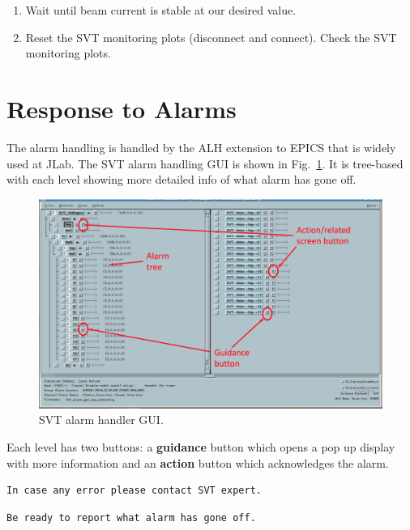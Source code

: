 \documentclass[12pt]{report}
\begin{document}
\begin{enumerate}
\item Wait until beam current is stable at our desired value.
\item Reset the SVT monitoring plots (disconnect and connect). Check the SVT monitoring plots.
\end{enumerate}


\section{Response to Alarms}

The alarm handling is handled by the ALH extension to EPICS that is widely used at JLab. The SVT alarm handling GUI is shown in Fig.~\ref{fig:svt_alarm_gui}. It is tree-based with each level showing more detailed info of what alarm has gone off. 
\begin{figure}[ht]
\includegraphics[width=12cm]{svt_alarm_gui}
\caption{SVT alarm handler GUI.\label{fig:svt_alarm_gui}}
\end{figure}

Each level has two buttons: a \textbf{guidance} button which opens a pop up display with more information and an \textbf{action} button which acknowledges the alarm. 

\begin{verbatim}
In case any error please contact SVT expert.
\end{verbatim}
\begin{verbatim}
Be ready to report what alarm has gone off.
\end{verbatim}
\end{document}

